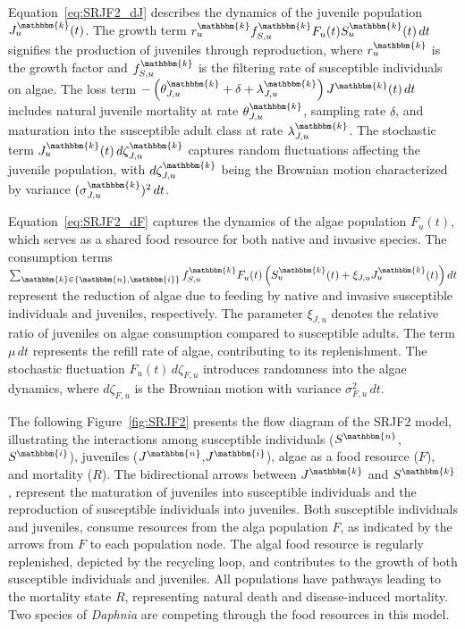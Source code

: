 \documentclass[aoas,preprint]{imsart}\usepackage[]{graphicx}\usepackage[]{xcolor}
\newcommand\unit{u}
\newcommand\species{\mathbbm{k}}
\newcommand\native{\mathbbm{n}}
\newcommand\invasive{\mathbbm{i}}
\begin{document}
Equation~\eqref{eq:SRJF2_dJ} describes the dynamics of the juvenile population $J^{\species}_{\unit}(t)$.
The growth term $r^{\species}_{\unit} f^{\species}_{S,\unit} F_{\unit}(t) S^{\species}_{\unit}(t) \, dt$ signifies the production of juveniles through reproduction, where $r^{\species}_{\unit}$ is the growth factor and $f^{\species}_{S,\unit}$ is the filtering rate of susceptible individuals on algae.
The loss term $-\left(\theta^{\species}_{J,\unit} + \delta + \lambda^{\species}_{J,\unit}\right) J^{\species}(t) \, dt$ includes natural juvenile mortality at rate $\theta^{\species}_{J,\unit}$, sampling rate $\delta$, and maturation into the susceptible adult class at rate $\lambda^{\species}_{J,\unit}$.
The stochastic term $J^{\species}_{\unit}(t) \, d\zeta^{\species}_{J,\unit}$ captures random fluctuations affecting the juvenile population, with $d\zeta^{\species}_{J,\unit}$ being the Brownian motion characterized by variance $(\sigma^{\species}_{J,{\unit}})^{2}\, dt$.
\parskip 3mm

Equation~\eqref{eq:SRJF2_dF} captures the dynamics of the algae population $F_{\unit}(t)$, which serves as a shared food resource for both native and invasive species.
The consumption terms $\sum_{\species \in \{\native, \invasive\}} f^{\species}_{S,{\unit}} F_{\unit}(t) \left(S^{\species}_{\unit}(t)+\xi_{J,{\unit}}J^{\species}_{\unit}(t)\right)dt$ represent the reduction of algae due to feeding by native and invasive susceptible individuals and juveniles, respectively.
The parameter $\xi_{J,\unit}$ denotes the relative ratio of juveniles on algae consumption compared to susceptible adults.
The term $\mu \, dt$ represents the refill rate of algae, contributing to its replenishment.
The stochastic fluctuation $F_{\unit}(t) \, d\zeta_{F,\unit}$ introduces randomness into the algae dynamics, where $d\zeta_{F,\unit}$ is the Brownian motion with variance $\sigma_{F,{\unit}}^{2}\, dt$.
\parskip 3mm

The following Figure~\ref{fig:SRJF2} presents the flow diagram of the SRJF2 model, illustrating the interactions among susceptible individuals ($S^{\native}$, $S^{\invasive}$), juveniles ($J^{\native}$,$J^{\invasive}$), algae as a food resource ($F$), and mortality ($R$).
The bidirectional arrows between $J^{\species}$ and $S^{\species}$, represent the maturation of juveniles into susceptible individuals and the reproduction of susceptible individuals into juveniles.
Both susceptible individuals and juveniles, consume resources from the alga population $F$, as indicated by the arrows from $F$ to each population node.
The algal food resource is regularly replenished, depicted by the recycling loop, and contributes to the growth of both susceptible individuals and juveniles.
All populations have pathways leading to the mortality state $R$, representing natural death and disease-induced mortality.
Two species of \textit{Daphnia} are competing through the food resources in this model.
\end{document}

